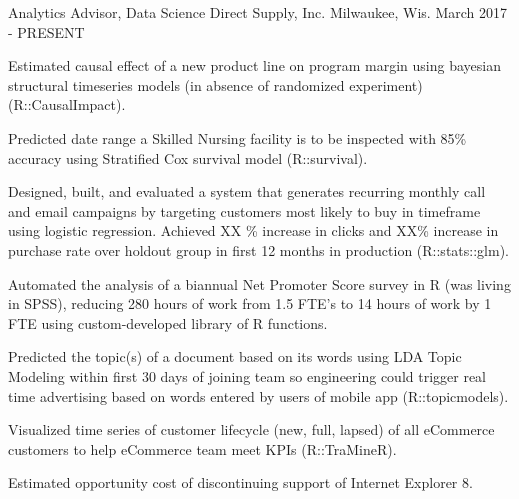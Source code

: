

\begin{cventries}

  \cventry
    {Analytics Advisor, Data Science} %
    {Direct Supply, Inc.} %
    {Milwaukee, Wis.} %
    {March 2017 - PRESENT} %
    {
      \begin{cvitems} %
        \item {Estimated causal effect of a new product line on program margin using bayesian structural timeseries models (in absence of randomized experiment) (R::CausalImpact).}
        \item {Predicted date range a Skilled Nursing facility is to be inspected with 85\% accuracy using Stratified Cox survival model (R::survival).}
        \item {Designed, built, and evaluated a system that generates recurring monthly call and email campaigns by targeting customers most likely to buy in timeframe using logistic regression. Achieved XX \% increase in clicks and XX\% increase in purchase rate over holdout group in first 12 months in production (R::stats::glm).}
        \item {Automated the analysis of a biannual Net Promoter Score survey in R (was living in SPSS), reducing 280 hours of work from 1.5 FTE’s to 14 hours of work by 1 FTE using custom-developed library of R functions.}
        \item {Predicted the topic(s) of a document based on its words using LDA Topic Modeling within first 30 days of joining team so engineering could trigger real time advertising based on words entered by users of mobile app (R::topicmodels).}
        \item {Visualized time series of customer lifecycle (new, full, lapsed) of all eCommerce customers to help eCommerce team meet KPIs (R::TraMineR).}
        \item {Estimated opportunity cost of discontinuing support of Internet Explorer 8.}
      \end{cvitems}
    }


\end{cventries}

